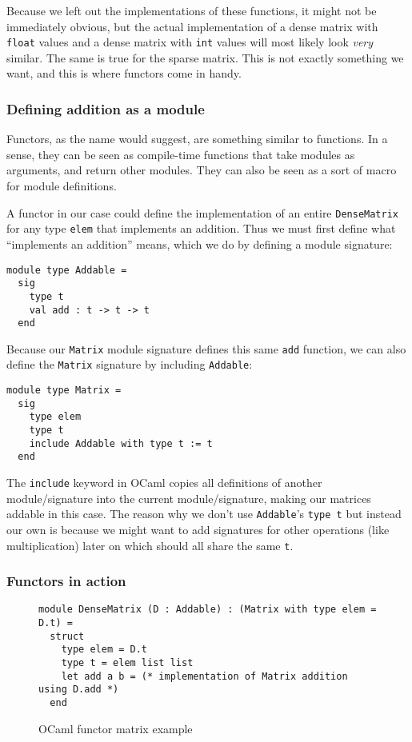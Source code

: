 Because we left out the implementations of these functions, it might not be immediately obvious, but the actual implementation of a dense matrix with \verb|float| values and a dense matrix with \verb|int| values will most likely look \emph{very} similar. The same is true for the sparse matrix. This is not exactly something we want, and this is where functors come in handy.

\subsubsection{Defining addition as a module}

Functors, as the name would suggest, are something similar to functions. In a sense, they can be seen as compile-time functions that take modules as arguments, and return other modules. They can also be seen as a sort of macro for module definitions.

A functor in our case could define the implementation of an entire \verb|DenseMatrix| for any type \verb|elem| that implements an addition. Thus we must first define what ``implements an addition'' means, which we do by defining a module signature:
\begin{verbatim}
module type Addable =
  sig
    type t
    val add : t -> t -> t
  end
\end{verbatim}
Because our \verb|Matrix| module signature defines this same \verb|add| function, we can also define the \verb|Matrix| signature by including \verb|Addable|:
\begin{verbatim}
module type Matrix =
  sig
    type elem
    type t
    include Addable with type t := t
  end
\end{verbatim}
The \verb|include| keyword in OCaml copies all definitions of another module/signature into the current module/signature, making our matrices addable in this case. The reason why we don't use \verb|Addable|'s \verb|type t| but instead our own is because we might want to add signatures for other operations (like multiplication) later on which should all share the same \verb|t|.

\subsubsection{Functors in action}

\begin{figure*}
\begin{verbatim}
module DenseMatrix (D : Addable) : (Matrix with type elem = D.t) =
  struct
    type elem = D.t
    type t = elem list list
    let add a b = (* implementation of Matrix addition using D.add *)
  end
\end{verbatim}
\caption{OCaml functor matrix example}
\label{ocaml-matrix-functor}
\end{figure*}

